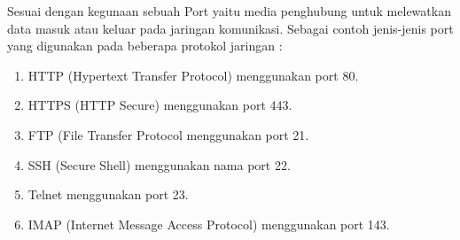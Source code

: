 \documentclass[12pt,a4paper]{article}
\begin{document}
\hspace{1cm}
Sesuai dengan kegunaan sebuah Port yaitu media penghubung untuk melewatkan data masuk atau keluar pada jaringan komunikasi. Sebagai contoh jenis-jenis port yang digunakan pada beberapa protokol jaringan :\\
\begin{enumerate}
\item HTTP (Hypertext Transfer Protocol) menggunakan port 80.
\item HTTPS (HTTP Secure) menggunakan port 443.
\item FTP (File Transfer Protocol menggunakan port 21.
\item SSH (Secure Shell) menggunakan nama port 22.
\item Telnet menggunakan port 23.
\item IMAP (Internet Message Access Protocol) menggunakan port 143.
\end{enumerate}
\end{document}
